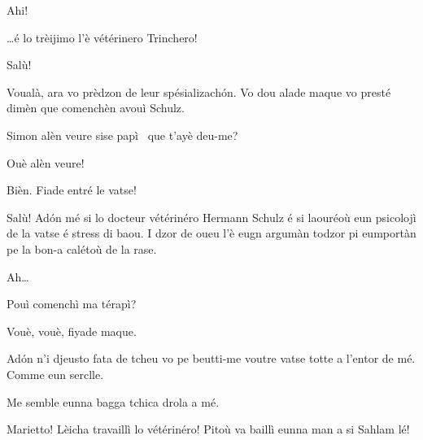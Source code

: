 \begin{drama}
\Mariettospeaks {} Ahi!


\Chefspeaks \ldots é lo trèijimo l'è vétérinero Trinchero!


\Trincherospeaks {} Salù!


\Chefspeaks Voualà, ara vo prèdzon de leur spésializach\'on. Vo dou  alade maque vo presté dimèn que comenchèn avouì Schulz.


\Chefspeaks Simon alèn veure sise papì \documenti\ que t'ayè deu-me?

\Simonspeaks Ouè alèn veure!

\Chefspeaks Bièn.  Fiade entré le vatse!




\Schulzspeaks {} Salù! Ad\'on mé si lo docteur vétérinéro Hermann Schulz é si laouréoù eun psicolojì de la vatse é stress di baou. I dzor de oueu l'è eugn argumàn todzor pi eumportàn pe la bon-a calétoù de la rase.

\Cienspeaks Ah\ldots

\Schulzspeaks Pouì comenchì ma térapì?

\Cienspeaks Vouè, vouè, fiyade maque.

\Schulzspeaks Ad\'on n’i djeusto fata de tcheu vo pe beutti-me voutre vatse totte a l'entor de mé. Comme eun serclle.

\Mariettospeaks {} Me semble eunna bagga tchica drola a mé.

\Cienspeaks Marietto! Lèicha travaillì lo vétérinéro! Pitoù va baillì eun\-na man a si Sahlam lé!


\end{drama}
